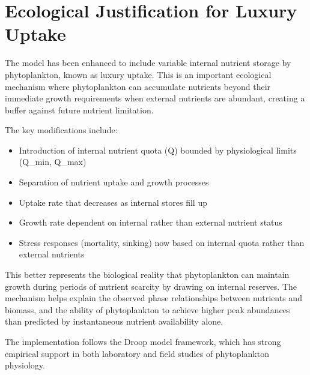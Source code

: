 \section{Ecological Justification for Luxury Uptake}

The model has been enhanced to include variable internal nutrient storage by phytoplankton, known as luxury uptake. This is an important ecological mechanism where phytoplankton can accumulate nutrients beyond their immediate growth requirements when external nutrients are abundant, creating a buffer against future nutrient limitation.

The key modifications include:

\begin{itemize}
    \item Introduction of internal nutrient quota (Q) bounded by physiological limits (Q\_min, Q\_max)
    \item Separation of nutrient uptake and growth processes
    \item Uptake rate that decreases as internal stores fill up
    \item Growth rate dependent on internal rather than external nutrient status
    \item Stress responses (mortality, sinking) now based on internal quota rather than external nutrients
\end{itemize}

This better represents the biological reality that phytoplankton can maintain growth during periods of nutrient scarcity by drawing on internal reserves. The mechanism helps explain the observed phase relationships between nutrients and biomass, and the ability of phytoplankton to achieve higher peak abundances than predicted by instantaneous nutrient availability alone.

The implementation follows the Droop model framework, which has strong empirical support in both laboratory and field studies of phytoplankton physiology.

